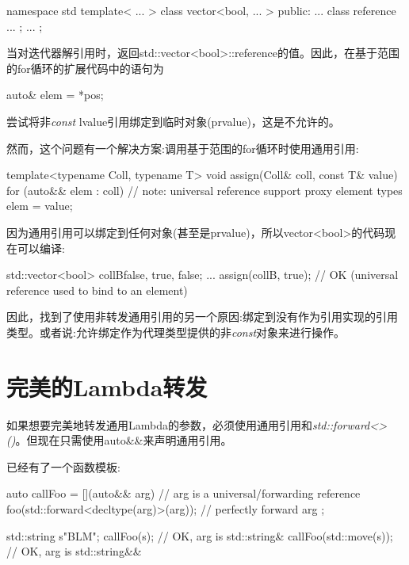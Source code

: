 \begin{codebox}[cpp]
namespace std {
  template< ... >
  class vector<bool, ... > {
    public:
    ...
    class reference {
      ...
    };
    ...
  };
}
\end{codebox}

当对迭代器解引用时，返回std::vector<bool>::reference的值。因此，在基于范围的for循环的扩展代码中的语句为\par

\begin{codebox}[cpp]
auto& elem = *pos;
\end{codebox}

尝试将非\textit{const} lvalue引用绑定到临时对象(prvalue)，这是不允许的。\par

然而，这个问题有一个解决方案:调用基于范围的for循环时使用通用引用:\par

\begin{codebox}[cpp]
template<typename Coll, typename T>
void assign(Coll& coll, const T& value) {
  for (auto&& elem : coll) { // note: universal reference support proxy element types
    elem = value;
  }
}
\end{codebox}

因为通用引用可以绑定到任何对象(甚至是prvalue)，所以vector<bool>的代码现在可以编译:\par

\begin{codebox}[cpp]
std::vector<bool> collB{false, true, false};
...
assign(collB, true); // OK (universal reference used to bind to an element)
\end{codebox}

因此，找到了使用非转发通用引用的另一个原因:绑定到没有作为引用实现的引用类型。或者说:允许绑定作为代理类型提供的非\textit{const}对象来进行操作。\par


\section{完美的Lambda转发}

如果想要完美地转发通用Lambda的参数，必须使用通用引用和\textit{std::\allowbreak{}forward<\allowbreak{}>(\allowbreak{})\allowbreak{}}。但现在只需使用auto\&\&来声明通用引用。\par

已经有了一个函数模板:\par

\begin{codebox}[cpp]
auto callFoo = [](auto&& arg) { // arg is a universal/forwarding reference
  foo(std::forward<decltype(arg)>(arg)); // perfectly forward arg
};

std::string s{"BLM"};
callFoo(s); // OK, arg is std::string&
callFoo(std::move(s)); // OK, arg is std::string&&
\end{codebox}

